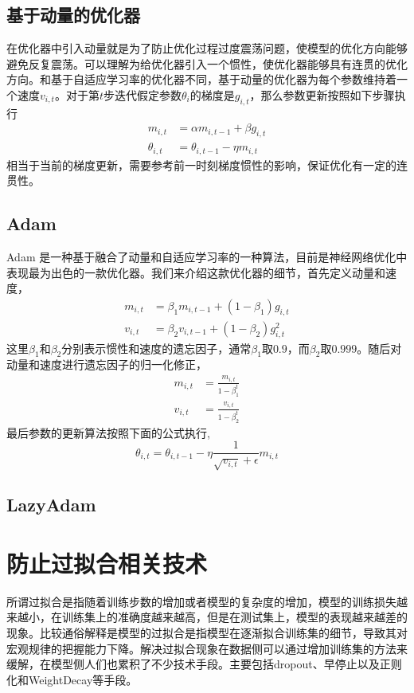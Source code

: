 \documentclass[twoside,a4paper,12pt]{book}%
\begin{document}
\subsection{基于动量的优化器}
在优化器中引入动量就是为了防止优化过程过度震荡问题，使模型的优化方向能够避免反复震荡。可以理解为给优化器引入一个惯性，使优化器能够具有连贯的优化方向。和基于自适应学习率的优化器不同，基于动量的优化器为每个参数维持着一个速度$v_{i,t}$。对于第$t$步迭代假定参数$\theta_i$的梯度是$g_{i,t}$，那么参数更新按照如下步骤执行
$$
\begin{aligned}
m_{i,t}&=\alpha m_{i,t-1} + \beta g_{i,t} \\
\theta_{i,t} &= \theta_{i,t-1} - \eta m_{i,t}
\end{aligned}
$$
相当于当前的梯度更新，需要参考前一时刻梯度惯性的影响，保证优化有一定的连贯性。
\subsection{Adam}
Adam 是一种基于融合了动量和自适应学习率的一种算法，目前是神经网络优化中表现最为出色的一款优化器。我们来介绍这款优化器的细节，首先定义动量和速度，
$$
\begin{aligned}
m_{i,t}&=\beta_1 m_{i,t-1} +(1-\beta_1)g_{i,t} \\
v_{i,t}&=\beta_2 v_{i,t-1} +(1-\beta_2)g_{i,t}^2
\end{aligned}
$$
这里$\beta_1$和$\beta_2$分别表示惯性和速度的遗忘因子，通常$\beta_1$取$0.9$，而$\beta_2$取$0.999$。随后对动量和速度进行遗忘因子的归一化修正，
$$
\begin{aligned}
m_{i,t}&=\frac{m_{i,t}}{1-\beta_1^t} \\
v_{i,t}&=\frac{v_{i,t}}{1-\beta_2^t}
\end{aligned}
$$
最后参数的更新算法按照下面的公式执行,
$$
\theta_{i,t}  =\theta_{i,t-1} -\eta \frac{1}{\sqrt{v_{i,t}}+\epsilon  } m_{i,t} 
$$
\subsection{LazyAdam}

\section{防止过拟合相关技术}
所谓过拟合是指随着训练步数的增加或者模型的复杂度的增加，模型的训练损失越来越小，在训练集上的准确度越来越高，但是在测试集上，模型的表现越来越差的现象。比较通俗解释是模型的过拟合是指模型在逐渐拟合训练集的细节，导致其对宏观规律的把握能力下降。解决过拟合现象在数据侧可以通过增加训练集的方法来缓解，在模型侧人们也累积了不少技术手段。主要包括dropout、早停止以及正则化和WeightDecay等手段。
\end{document}
